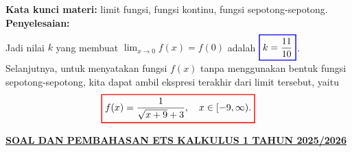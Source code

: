 \documentclass[10pt,openany,a4paper]{article}
\theoremstyle{definition}
\theoremstyle{definition}
\theoremstyle{plain}
\newenvironment{jawab}[2][tes]{
\textbf{Kata kunci materi:} #1.\\
\textbf{Penyelesaian:} #2
}{}
\begin{document}
\begin{enumerate}
\begin{jawab}[limit fungsi, fungsi kontinu, fungsi sepotong-sepotong]
{\begin{align*}
            \end{align*}
            Jadi nilai $k$ yang membuat $\lim_{x \to 0} f(x) = f(0)$ adalah $\colorlet{oldcolor}{.}
        \color{blue}
        \setlength{\fboxrule}{1pt} \boxed{\color{oldcolor}k = \frac{11}{10}}\color{oldcolor}$.
        Selanjutnya, untuk menyatakan fungsi $f(x)$ tanpa menggunakan bentuk fungsi sepotong-sepotong, kita dapat ambil ekspresi terakhir dari limit tersebut, yaitu
        \begin{align*}
            \colorlet{oldcolor}{.}
        \color{red}
        \setlength{\fboxrule}{1pt} \boxed{\color{oldcolor}f(x) = \frac{1}{\sqrt{x+9}+3}, \quad x \in [-9,\infty).}
        \end{align*}
    }
    \end{jawab}
\end{enumerate}
\newpage
 \begin{center}
	{\underline{\textbf{\MakeUppercase{Soal dan Pembahasan ETS Kalkulus 1 Tahun 2025/2026}}}}
    \end{center}
\end{document}
